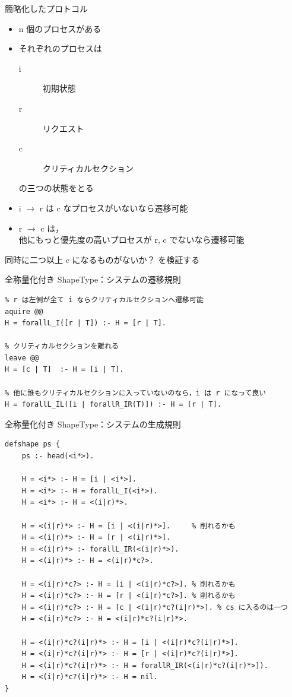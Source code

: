 \documentclass[presentation, xetex]{beamer}
\begin{document}
\begin{frame}[label={sec:orge5dfc00}]{簡略化したプロトコル}
\begin{itemize}
\item n 個のプロセスがある
\item それぞれのプロセスは
\begin{description}
\item[{i}] 初期状態
\item[{r}] リクエスト
\item[{c}] クリティカルセクション
\end{description}
の三つの状態をとる
\item i \(\longrightarrow\) r は c なプロセスがいないなら遷移可能
\item r \(\longrightarrow\) c は，\\
他にもっと優先度の高いプロセスが r, c でないなら遷移可能
\end{itemize}


同時に二つ以上 c になるものがないか？
を検証する
\end{frame}



\begin{frame}[label={sec:orgd430723},fragile]{全称量化付き ShapeType：システムの遷移規則}
 \footnotesize
\begin{verbatim}
% r は左側が全て i ならクリティカルセクションへ遷移可能
aquire @@
H = forallL_I([r | T]) :- H = [r | T].

% クリティカルセクションを離れる
leave @@
H = [c | T]  :- H = [i | T].

% 他に誰もクリティカルセクションに入っていないのなら，i は r になって良い
H = forallL_IL([i | forallR_IR(T)]) :- H = [r | T].
\end{verbatim}
\end{frame}




\begin{frame}[label={sec:org3fa012c},fragile]{全称量化付き ShapeType：システムの生成規則}
 \tiny
\begin{verbatim}
defshape ps {
    ps :- head(<i*>).

    H = <i*> :- H = [i | <i*>].
    H = <i*> :- H = forallL_I(<i*>).
    H = <i*> :- H = <(i|r)*>.

    H = <(i|r)*> :- H = [i | <(i|r)*>].     % 削れるかも
    H = <(i|r)*> :- H = [r | <(i|r)*>].
    H = <(i|r)*> :- forallL_IR(<(i|r)*>).
    H = <(i|r)*> :- H = <(i|r)*c?>.

    H = <(i|r)*c?> :- H = [i | <(i|r)*c?>]. % 削れるかも
    H = <(i|r)*c?> :- H = [r | <(i|r)*c?>]. % 削れるかも
    H = <(i|r)*c?> :- H = [c | <(i|r)*c?(i|r)*>]. % cs に入るのは一つ
    H = <(i|r)*c?> :- H = <(i|r)*c?(i|r)*>.

    H = <(i|r)*c?(i|r)*> :- H = [i | <(i|r)*c?(i|r)*>].
    H = <(i|r)*c?(i|r)*> :- H = [r | <(i|r)*c?(i|r)*>].
    H = <(i|r)*c?(i|r)*> :- H = forallR_IR(<(i|r)*c?(i|r)*>]).
    H = <(i|r)*c?(i|r)*> :- H = nil.
}
\end{verbatim}
\end{frame}
\end{document}
